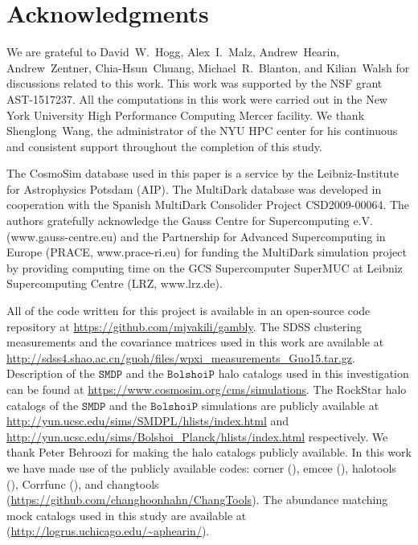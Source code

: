 \documentclass[twocolumn]{aastex61}
\begin{document}
\section*{Acknowledgments}

We are grateful to David~W.~Hogg, Alex~I.~Malz, Andrew~Hearin, Andrew~Zentner, Chia-Hsun~Chuang, Michael~R.~Blanton, and Kilian~Walsh for discussions related to this work. This work was supported by the NSF grant AST-1517237. All the computations in this work were carried out in the New York University High Performance Computing Mercer facility. We thank Shenglong~Wang, the administrator of the NYU HPC center for his continuous and consistent support throughout the completion of this study. 

The CosmoSim database used in this paper is a service by the Leibniz-Institute for Astrophysics Potsdam (AIP). The MultiDark database was developed in cooperation with the Spanish MultiDark Consolider Project CSD2009-00064. The authors gratefully acknowledge the Gauss Centre for Supercomputing e.V. (www.gauss-centre.eu) and the Partnership for Advanced Supercomputing in Europe (PRACE, www.prace-ri.eu) for funding the MultiDark simulation project by providing computing time on the GCS Supercomputer SuperMUC at Leibniz Supercomputing Centre (LRZ, www.lrz.de).

All of the code written for this project is available in an open-source
code repository at \url{https://github.com/mjvakili/gambly}. The SDSS clustering measurements and the covariance matrices used in this work are available at \url{http://sdss4.shao.ac.cn/guoh/files/wpxi_measurements_Guo15.tar.gz}. Description of the $\mathtt{SMDP}$ and the $\mathtt{BolshoiP}$ halo catalogs used in this investigation can be found at \url{https://www.cosmosim.org/cms/simulations}. The RockStar halo catalogs of the $\mathtt{SMDP}$ and the $\mathtt{BolshoiP}$ simulations are publicly available at \url{http://yun.ucsc.edu/sims/SMDPL/hlists/index.html} and \url{http://yun.ucsc.edu/sims/Bolshoi_Planck/hlists/index.html} respectively. We thank Peter Behroozi for making the halo catalogs publicly available. In this work we have made use of the publicly available codes: corner (\citealt{corner}), emcee (\citealt{emcee}), halotools (\citealt{halotools}), Corrfunc (\citealt{corrfunc}), and changtools (\url{https://github.com/changhoonhahn/ChangTools}). The abundance matching mock catalogs used in this study are available at (\url{http://logrus.uchicago.edu/~aphearin/}).  
\end{document}
